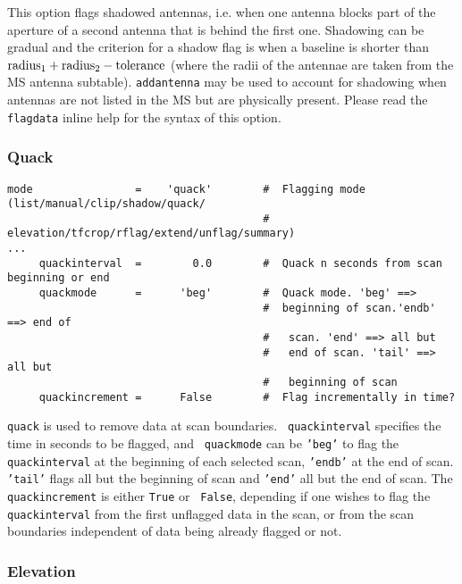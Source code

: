 \normalsize 

This option flags shadowed antennas, i.e. when one antenna blocks
part of the aperture of a second antenna that is behind the first
one. Shadowing can be gradual and the criterion for a shadow flag is
when a baseline is shorter than ${\rm radius}_1 + {\rm radius}_2 - {\rm tolerance}$
(where the radii of the antennae are taken from the MS antenna
subtable). {\tt addantenna} may be used to account for shadowing when
antennas are not listed in the MS but are physically present. Please
read the {\tt flagdata} inline help for the syntax of this option.


\subsubsection{Quack}
\label{section:edit.flagdata.mode.quack}
\small
\begin{verbatim}
mode                =    'quack'        #  Flagging mode (list/manual/clip/shadow/quack/
                                        #   elevation/tfcrop/rflag/extend/unflag/summary)
...
     quackinterval  =        0.0        #  Quack n seconds from scan beginning or end
     quackmode      =      'beg'        #  Quack mode. 'beg' ==>
                                        #  beginning of scan.'endb' ==> end of
                                        #   scan. 'end' ==> all but
                                        #   end of scan. 'tail' ==> all but
                                        #   beginning of scan
     quackincrement =      False        #  Flag incrementally in time?
\end{verbatim}
\normalsize

{\tt quack} is used to remove data at scan boundaries. {\tt
  quackinterval} specifies the time in seconds to be flagged, and {\tt
  quackmode} can be {\tt 'beg'} to flag the {\tt quackinterval} at the
beginning of each selected scan, {\tt 'endb'} at the end of scan. {\tt
  'tail'} flags all but the beginning of scan and {\tt 'end'} all but
the end of scan. The {\tt quackincrement} is either {\tt True} or {\tt
  False}, depending if one wishes to flag the {\tt quackinterval} from
the first unflagged data in the scan, or from the scan boundaries
independent of data being already flagged or not.

\subsubsection{Elevation}
\label{section:edit.flagdata.mode.elevation}


